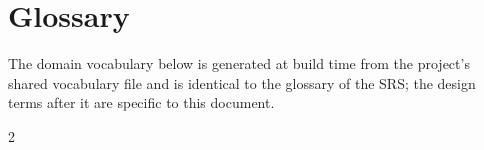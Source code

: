 \section{Glossary}\label{app:glossary}

The domain vocabulary below is generated at build time from the project's shared vocabulary file and is identical to the glossary of the SRS; the design terms after it are specific to this document.

\begin{multicols}{2}
\footnotesize



\end{multicols}
